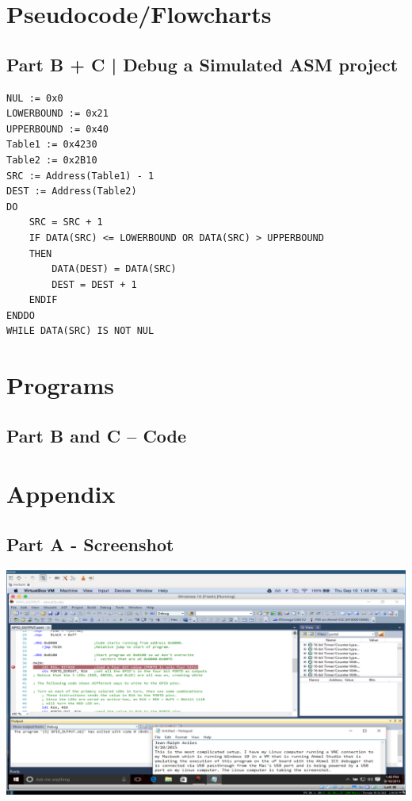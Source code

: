 \documentclass[letterpaper, 12pt]{article}
\begin{document}
\section*{Pseudocode/Flowcharts}
\subsection*{Part B + C | Debug a Simulated ASM project}
\begin{center}
\begin{lstlisting}
NUL := 0x0
LOWERBOUND := 0x21
UPPERBOUND := 0x40
Table1 := 0x4230
Table2 := 0x2B10
SRC := Address(Table1) - 1
DEST := Address(Table2)
DO
	SRC = SRC + 1
	IF DATA(SRC) <= LOWERBOUND OR DATA(SRC) > UPPERBOUND
	THEN
		DATA(DEST) = DATA(SRC)
		DEST = DEST + 1
	ENDIF
ENDDO
WHILE DATA(SRC) IS NOT NUL
\end{lstlisting}
\end{center}
\section*{Programs}
\subsection*{Part B and C -- Code}

\section*{Appendix}
\subsection*{Part A - Screenshot}
\begin{center}
\includegraphics[width=1.0\textwidth,keepaspectratio=true]{emulation}
\end{center}
\end{document}

